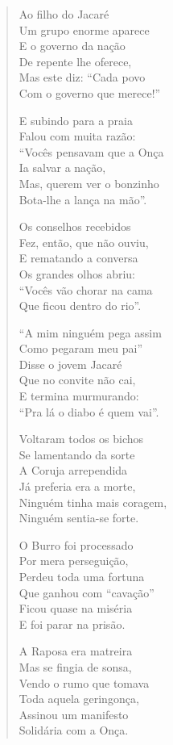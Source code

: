 \begin{verse}
Ao filho do Jacaré\\
Um grupo enorme aparece\\
E o governo da nação\\
De repente lhe oferece,\\
Mas este diz: “Cada povo\\
Com o governo que merece!”
\pagebreak

E subindo para a praia\\
Falou com muita razão:\\
“Vocês pensavam que a Onça\\
Ia salvar a nação,\\
Mas, querem ver o bonzinho\\
Bota-lhe a lança na mão”.

Os conselhos recebidos\\
Fez, então, que não ouviu,\\
E rematando a conversa\\
Os grandes olhos abriu:\\
“Vocês vão chorar na cama\\
Que ficou dentro do rio”.

“A mim ninguém pega assim\\
Como pegaram meu pai”\\
Disse o jovem Jacaré\\
Que no convite não cai,\\
E termina murmurando:\\
“Pra lá o diabo é quem vai”.

Voltaram todos os bichos\\
Se lamentando da sorte\\
A Coruja arrependida\\
Já preferia era a morte,\\
Ninguém tinha mais coragem,\\
Ninguém sentia-se forte.
\pagebreak

O Burro foi processado\\
Por mera perseguição,\\
Perdeu toda uma fortuna\\
Que ganhou com “cavação”\\
Ficou quase na miséria\\
E foi parar na prisão.

A Raposa era matreira\\
Mas se fingia de sonsa,\\
Vendo o rumo que tomava\\
Toda aquela geringonça,\\
Assinou um manifesto\\
Solidária com a Onça.


\end{verse}
